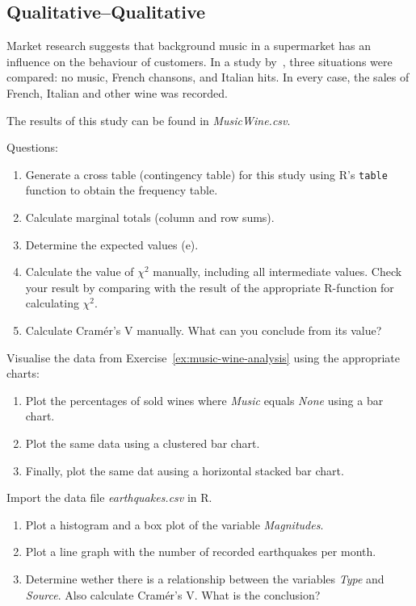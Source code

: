 \subsection{Qualitative--Qualitative}
\label{ssec:ex-qualitative-qualitative}

\begin{exercise}
  \label{ex:music-wine-analysis} %
  
  Market research suggests that background music in a supermarket has an influence on the behaviour of customers. In a study by~\textcite{Ryan1998}, three situations were compared: no music, French chansons, and Italian hits. In every case, the sales of French, Italian and other wine was recorded.
  
  The results of this study can be found in \emph{MusicWine.csv}. 
  
  Questions:
  \begin{enumerate}
    \item Generate a cross table (contingency table) for this study using R's \texttt{table} function to obtain the frequency table.
    \item Calculate marginal totals (column and row sums).
    \item Determine the expected values (e).
    \item Calculate the value of $\chi^{2}$ manually, including all intermediate values. Check your result by comparing with the result of the appropriate R-function for calculating $\chi^{2}$.
    \item Calculate Cramér's V manually. What can you conclude from its value?
  \end{enumerate}
\end{exercise}

\begin{exercise}
  \label{ex:ex:music-wine-crosstable-visualization}
  Visualise the data from Exercise~\ref{ex:music-wine-analysis} using the appropriate charts:
  \begin{enumerate}
    \item Plot the percentages of sold wines where \emph{Music} equals \emph{None} using a bar chart.
    \item Plot the same data using a clustered bar chart.
    \item Finally, plot the same dat ausing a horizontal stacked bar chart.
  \end{enumerate}
\end{exercise}

\begin{exercise}
  \label{ex:earthquakes} %
  Import the data file \emph{earthquakes.csv} in R.
  \begin{enumerate}
    \item Plot a histogram and a box plot of the variable \emph{Magnitudes}.
    \item Plot a line graph with the number of recorded earthquakes per month.
    \item Determine wether there is a relationship between the variables \emph{Type} and \emph{Source}. Also calculate Cramér's V. What is the conclusion?
  \end{enumerate}
\end{exercise}

